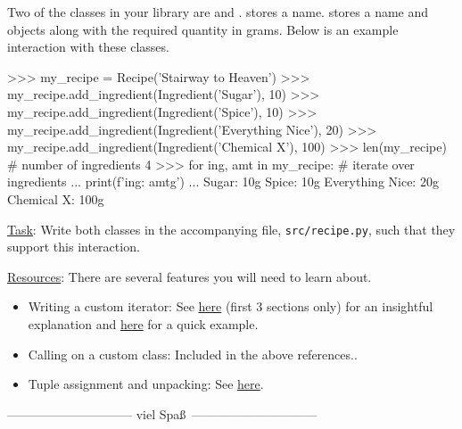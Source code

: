 \documentclass[a4paper]{exam}
\begin{document}
\begin{questions}
Two of the classes in your library are  and .  stores a name.  stores a name and  objects along with the required quantity in grams. Below is an example interaction with these classes.

\begin{python}
>>> my_recipe = Recipe('Stairway to Heaven')
>>> my_recipe.add_ingredient(Ingredient('Sugar'), 10)
>>> my_recipe.add_ingredient(Ingredient('Spice'), 10)
>>> my_recipe.add_ingredient(Ingredient('Everything Nice'), 20)
>>> my_recipe.add_ingredient(Ingredient('Chemical X'), 100)
>>> len(my_recipe)  # number of ingredients
4
>>> for ing, amt in my_recipe:  # iterate over ingredients
...     print(f'{ing}: {amt}g')
... 
Sugar: 10g
Spice: 10g
Everything Nice: 20g
Chemical X: 100g
\end{python}

\noindent\underline{Task}: Write both classes in the accompanying file, \texttt{src/recipe.py}, such that they support this interaction.

\noindent\underline{Resources}: There are several features you will need to learn about.
\begin{itemize}
\item Writing a custom iterator: See \href{https://treyhunner.com/2018/06/how-to-make-an-iterator-in-python/}{here} (first 3 sections only) for an insightful explanation and \href{https://www.geeksforgeeks.org/iterators-in-python/}{here} for a quick example.
\item Calling  on a custom class: Included in the above references..
\item Tuple assignment and unpacking: See \href{https://runestone.academy/ns/books/published//fopp/Tuples/TupleAssignmentwithunpacking.html}{here}.
\end{itemize}

\end{questions}

\vfill
\centerline{------------------------------ viel Spa\ss\ ------------------------------}
\end{document}
